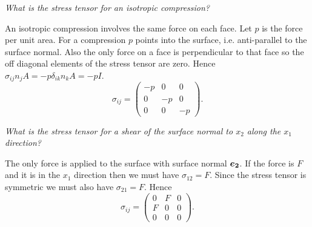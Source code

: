 \documentclass[a4paper]{article}
\renewcommand{\ident}{I}
\begin{document}
    \begin{example}\label{exa:isotropic compression stress tensor}
        \textit{What is the stress tensor for an isotropic compression?}
        
        An isotropic compression involves the same force on each face.
        Let \(p\) is the force per unit area.
        For a compression \(p\) points into the surface, i.e. anti-parallel to the surface normal.
        Also the only force on a face is perpendicular to that face so the off diagonal elements of the stress tensor are zero.
        Hence \(\sigma_{ij}n_jA = -p\delta_{ik}n_kA = -p\ident\).
        \[
            \sigma_{ij} = 
            \begin{pmatrix}
                -p & 0 & 0\\
                0 & -p & 0\\
                0 & 0 & -p
            \end{pmatrix}
            .
        \]
    \end{example}
    \begin{example}\label{exa:shear stress tensor}
        \textit{What is the stress tensor for a shear of the surface normal to \(x_2\) along the \(x_1\) direction?}
        
        The only force is applied to the surface with surface normal \(\bm{e_{2}}\).
        If the force is \(F\) and it is in the \(x_1\) direction then we must have \(\sigma_{12} = F\).
        Since the stress tensor is symmetric we must also have \(\sigma_{21} = F\).
        Hence
        \[
            \sigma_{ij} =
            \begin{pmatrix}
                0 & F & 0\\
                F & 0 & 0\\
                0 & 0 & 0
            \end{pmatrix}
            .
        \]
    \end{example}
    
\end{document}
